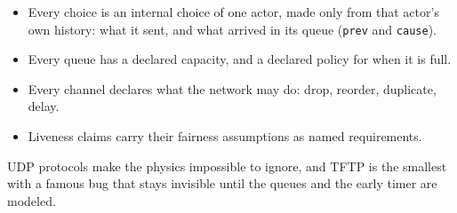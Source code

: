 \begin{itemize}
  \item Every choice is an internal choice of one actor, made only from that
        actor's own history: what it sent, and what arrived in its queue
        (\texttt{prev} and \texttt{cause}).
  \item Every queue has a declared capacity, and a declared policy for when it
        is full.
  \item Every channel declares what the network may do: drop, reorder,
        duplicate, delay.
  \item Liveness claims carry their fairness assumptions as named
        requirements.
\end{itemize}

UDP protocols make the physics impossible to ignore, and TFTP is the smallest with
a famous bug that stays invisible until the queues and the early timer are modeled.
